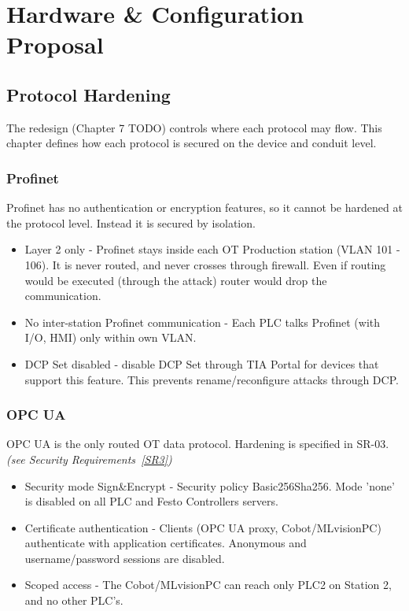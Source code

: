 \documentclass[11pt,a4paper]{article}
\begin{document}
\section{Hardware \& Configuration Proposal}
\subsection{Protocol Hardening}
The redesign (Chapter 7 TODO) controls where each protocol may flow. This
chapter defines how each protocol is secured on the device and conduit level.

\subsubsection{Profinet}
Profinet has no authentication or encryption features, so it cannot be hardened
at the protocol level. Instead it is secured by isolation.
\begin{itemize}

    \item Layer 2 only - Profinet stays inside each OT Production station (VLAN
        101 - 106). It is never routed, and never crosses through firewall.
        Even if routing would be executed (through the attack) router would
        drop the communication.

    \item No inter-station Profinet communication - Each PLC talks Profinet
        (with I/O, HMI) only within own VLAN.

    \item DCP Set disabled - disable DCP Set through TIA Portal for devices
        that support this feature. This prevents rename/reconfigure attacks
        through DCP.

\end{itemize}

\subsubsection{OPC UA}

OPC UA is the only routed OT data protocol. Hardening is specified in SR-03. \textit{(see Security Requirements~\ref{SR3})}

\begin{itemize}

    \item Security mode Sign\&Encrypt - Security policy Basic256Sha256. Mode
        'none' is disabled on all PLC and Festo Controllers servers.

    \item Certificate authentication - Clients (OPC UA proxy, Cobot/MLvisionPC)
        authenticate with application certificates. Anonymous and
        username/password sessions are disabled.

    \item Scoped access - The Cobot/MLvisionPC can reach only PLC2 on Station
        2, and no other PLC's.

\end{itemize}
\end{document}
